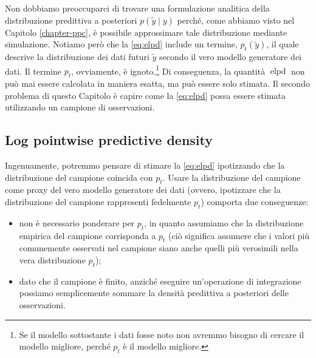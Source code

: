 \documentclass[
  10pt,
  italian,
  a4paper,
  extrafontsizes,onecolumn,openright
  ]{memoir}
\providecommand{\tightlist}{%
  \setlength{\itemsep}{0pt}\setlength{\parskip}{0pt}}
\DeclareMathOperator{\elpd}{elpd} %
\theoremstyle{definition}
\theoremstyle{definition}
\theoremstyle{definition}
\theoremstyle{definition}
\theoremstyle{remark}
\begin{document}
Non dobbiamo preoccuparci di trovare una formulazione analitica della distribuzione predittiva a posteriori \(p(\tilde{y} \mid y)\) perché, come abbiamo visto nel Capitolo \ref{chapter-ppc}, è possibile approssimare tale distribuzione mediante simulazione. Notiamo però che la \eqref{eq:elpd} include un termine, \(p_t(\tilde{y})\), il quale descrive la distribuzione dei dati futuri \(\tilde{y}\) secondo il vero modello generatore dei dati. Il termine \(p_t\), ovviamente, è ignoto.\footnote{Se il modello sottostante i dati fosse noto non avremmo bisogno di cercare il modello migliore, perché \(p_t\) è il modello migliore.} Di conseguenza, la quantità \(\elpd\) non può mai essere calcolata in maniera esatta, ma può essere solo stimata. Il secondo problema di questo Capitolo è capire come la \eqref{eq:elpd} possa essere stimata utilizzando un campione di osservazioni.

\hypertarget{log-pointwise-predictive-density}{%
\subsection{Log pointwise predictive density}\label{log-pointwise-predictive-density}}

Ingenuamente, potremmo pensare di stimare la \eqref{eq:elpd} ipotizzando che la distribuzione del campione coincida con \(p_t\). Usare la distribuzione del campione come proxy del vero modello generatore dei dati (ovvero, ipotizzare che la distribuzione del campione rappresenti fedelmente \(p_t\)) comporta due conseguenze:

\begin{itemize}
\tightlist
\item
  non è necessario ponderare per \(p_t\), in quanto assumiamo che la distribuzione empirica del campione corrisponda a \(p_t\) (ciò significa assumere che i valori più comunemente osservati nel campione siano anche quelli più verosimili nella vera distribuzione \(p_t\));
\item
  dato che il campione è finito, anziché eseguire un'operazione di integrazione possiamo semplicemente sommare la densità predittiva a posteriori delle osservazioni.
\end{itemize}
\end{document}
